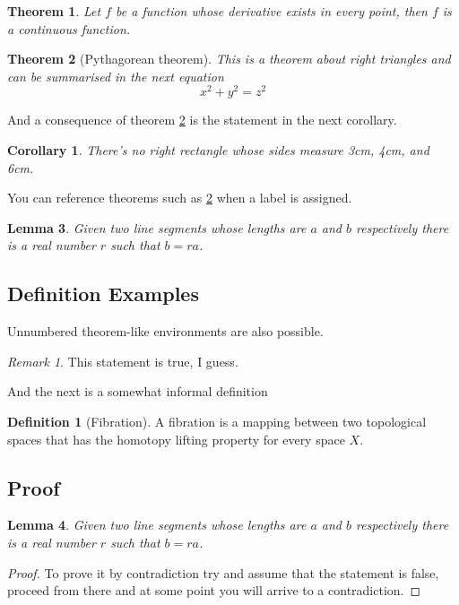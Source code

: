 \documentclass{article}
\newtheorem{theorem}{Theorem}[section] %
\newtheorem{corollary}{Corollary}[theorem]
\newtheorem{lemma}[theorem]{Lemma}
\theoremstyle{definition}
\newtheorem{definition}{Definition}[section]
\theoremstyle{remark}
\newtheorem*{remark}{Remark}
\begin{document}
\begin{theorem}
Let \(f\) be a function whose derivative exists in every point, then \(f\) is 
a continuous function.
\end{theorem}

\begin{theorem}[Pythagorean theorem]
\label{pythagorean}
This is a theorem about right triangles and can be summarised in the next 
equation 
\[ x^2 + y^2 = z^2 \]
\end{theorem}

And a consequence of theorem \ref{pythagorean} is the statement in the next 
corollary.
\begin{corollary}
There's no right rectangle whose sides measure 3cm, 4cm, and 6cm.
\end{corollary}

You can reference theorems such as \ref{pythagorean} when a label is assigned.
\begin{lemma}
Given two line segments whose lengths are \(a\) and \(b\) respectively there is a 
real number \(r\) such that \(b=ra\).
\end{lemma}



\subsection{Definition Examples}
Unnumbered theorem-like environments are also possible.
\begin{remark}
This statement is true, I guess.
\end{remark}
And the next is a somewhat informal definition
\begin{definition}[Fibration]
A fibration is a mapping between two topological spaces that has the homotopy lifting property for every space \(X\).
\end{definition}









\subsection{Proof}
\begin{lemma}
Given two line segments whose lengths are \(a\) and \(b\) respectively there 
is a real number \(r\) such that \(b=ra\).
\end{lemma}
\begin{proof}
To prove it by contradiction try and assume that the statement is false,
proceed from there and at some point you will arrive to a contradiction.
\end{proof}
\end{document}
